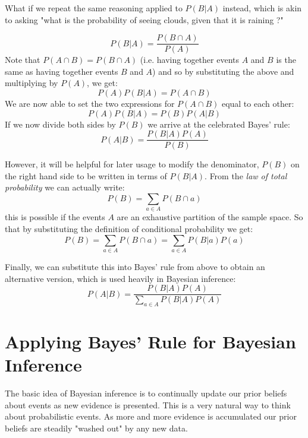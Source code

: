What if we repeat the same reasoning applied to $P(B|A)$ instead, which is akin to asking "what is the probability of seeing clouds, given that it is raining ?"

\begin{equation}
  P(B|A)=\frac{P(B\cap A)}{P(A)}
\end{equation}
Note that $P(A\cap B) = P(B\cap A)$ (i.e. having together events $A$ and $B$ is the same as having together events $B$ and $A$) and so by substituting the above and multiplying by $P(A)$, we get:
\begin{equation}
  P(A)P(B|A)=P(A\cap B)
\end{equation}
We are now able to set the two expressions for $P(A\cap B)$ equal to each other:
\begin{equation}
  P(A)P(B|A)=P(B)P(A|B)
\end{equation}
If we now divide both sides by $P(B)$ we arrive at the celebrated Bayes' rule:
\begin{equation}
  P(A|B)=\frac{P(B|A)P(A)}{P(B)}
\end{equation}

However, it will be helpful for later usage to modify the denominator, $P(B)$ on the right hand side to be written in terms of $P(B|A)$. From the \emph{law of total probability} we can actually write:
\begin{equation}
P(B)=\sum_{a\in A}P(B\cap a)
\end{equation}
this is possible if the events $A$ are an exhaustive partition of the sample space. So that by substituting the definition of conditional probability we get:
\begin{equation}
P(B)=\sum_{a\in A}P(B\cap a) = \sum_{a\in A}P(B|a)P(a)  
\end{equation}

Finally, we can substitute this into Bayes' rule from above to obtain an alternative version, which is used heavily in Bayesian inference:
\begin{equation}
P(A|B)=\frac{P(B|A)P(A)}{\sum_{a\in A}P(B|A)P(A)}
\end{equation}

\section{Applying Bayes' Rule for Bayesian Inference}
The basic idea of Bayesian inference is to continually update our prior beliefs about events as new evidence is presented. This is a very natural way to think about probabilistic events. As more and more evidence is accumulated our prior beliefs are steadily "washed out" by any new data.

